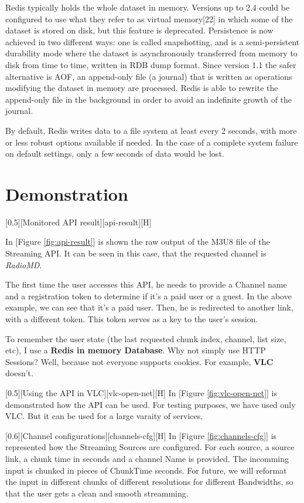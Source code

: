 \documentclass{article}
\begin{document}
			Redis typically holds the whole dataset in memory. Versions up to 2.4 could be configured to use what they refer to as virtual memory[22] in which some of the dataset is stored on disk, but this feature is deprecated. Persistence is now achieved in two different ways: one is called snapshotting, and is a semi-persistent durability mode where the dataset is asynchronously transferred from memory to disk from time to time, written in RDB dump format. Since version 1.1 the safer alternative is AOF, an append-only file (a journal) that is written as operations modifying the dataset in memory are processed. Redis is able to rewrite the append-only file in the background in order to avoid an indefinite growth of the journal.

			By default, Redis writes data to a file system at least every 2 seconds, with more or less robust options available if needed. In the case of a complete system failure on default settings, only a few seconds of data would be lost.

	\newpage
	\section{Demonstration}
		[0.5][Monitored API result][api-result][H]

		In [Figure \ref{fig:api-result}] is shown the raw output of the M3U8 file of the Streaming API. It can be seen in this case, that the requested channel is \textit{RadioMD}.

		The first time the user accesses this API, he needs to provide a Channel name and a registration token to determine if it's a paid user or a guest. In the above example, we can see that it's a paid user. Then, he is redirected to another link, with a different token. This token serves as a key to the user's session.

		To remember the user state (the last requested chunk index, channel, list size, etc), I use a \textbf{Redis in memory Database}. Why not simply use HTTP Sessions? Well, because not everyone supports cookies. For example, \textbf{VLC} doesn't.

		[0.5][Using the API in VLC][vlc-open-net][H]
		In [Figure \ref{fig:vlc-open-net}] is demonstrated how the API can be used. For testing purposes, we have used only VLC. But it can be used for a large varaity of services.

		[0.6][Channel configurations][channels-cfg][H]
		In [Figure \ref{fig:channels-cfg}] is represented how the Streaming Sources are configured. For each source, a source link, a chunk time in seconds and a channel Name is provided. The incomming input is chunked in pieces of ChunkTime seconds. For future, we will reformat the input in different chunks of different resolutions for different Bandwidths, so that the user gets a clean and smooth streamming.
\end{document}
